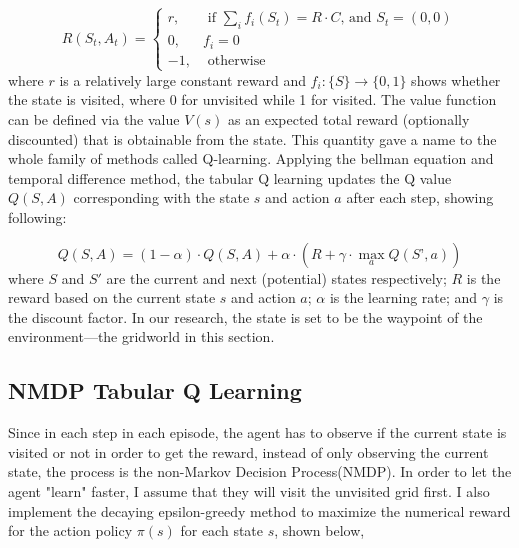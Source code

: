 \documentclass{article}
\begin{document}
\begin{equation}
\label{eq:1}
R\left(S_t, A_t\right)=\left\{\begin{array}{ll}
r, & \text { if } \sum_{i} f_{i}\left(S_{t}\right) = R\cdot C \text{, and } S_t =(0,0) \\
0, & f_{i} = 0 \\
-1, & \text { otherwise }
\end{array}\right.
\end{equation}
where $r$ is a relatively large constant reward and $f_i:\{S\} \rightarrow \{0,1\}$ shows whether the state is visited, where 0 for unvisited while 1 for visited. The value function can be defined via the value $V(s)$ as an expected total reward (optionally discounted) that is obtainable from the state. 
This quantity gave a name to the whole family of methods called Q-learning\cite{drl}. Applying the bellman equation and temporal difference method, the tabular Q learning updates the Q value $Q(S,A)$ corresponding with the state $s$ and action $a$ after each step, showing following:

\begin{equation}
\label{eq:q}
   Q(S, A) = (1-\alpha) \cdot Q(S, A) + \alpha \cdot (R + \gamma \cdot \max_{a} Q(S’, a))
\end{equation}
where $S$ and $S'$ are the current and next (potential) states respectively; $R$ is the reward based on the current state $s$ and action $a$; $\alpha$ is the learning rate; and $\gamma$ is the discount factor\cite{drl}. In our research, the state is set to be the waypoint of the environment---the gridworld in this section.  


\subsection{NMDP Tabular Q Learning}
\hspace{\parindent} Since in each step in each episode, the agent has to observe if the current state is visited or not in order to get the reward, instead of only observing the current state, the process is the non-Markov Decision Process(NMDP). In order to let the agent "learn" faster, I assume that they will visit the unvisited grid first. I also implement the decaying epsilon-greedy method to maximize the numerical reward for the action policy $\pi(s)$ for each state $s$, shown below,
\end{document}
